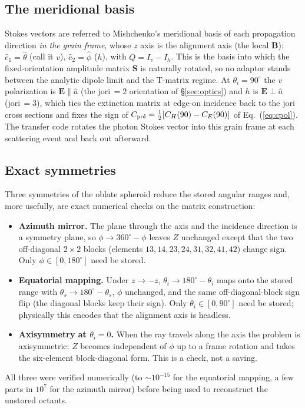 \documentclass{my_memo}
\let\mathbf\boldsymbol
\newcommand{\Cpol}{\ensuremath{C_{\rm pol}}}
\begin{document}
\subsection{The meridional basis}

Stokes vectors are referred to Mishchenko's meridional basis of each propagation
direction \emph{in the grain frame}, whose $z$ axis is the alignment axis (the
local $\mathbf{B}$): $\hat e_1 = \hat\theta$ (call it $v$), $\hat e_2 = \hat\phi$
($h$), with $Q = I_v - I_h$. This is the basis into which the fixed-orientation
amplitude matrix $\mathbf{S}$ is naturally rotated, so no adaptor stands between
the analytic dipole limit and the T-matrix regime. At $\theta_i = 90^\circ$ the
$v$ polarization is $\mathbf{E}\parallel\hat a$ (the jori\,$=2$ orientation of
\S\ref{sec:optics}) and $h$ is $\mathbf{E}\perp\hat a$ (jori\,$=3$), which ties
the extinction matrix at edge-on incidence back to the jori cross sections and
fixes the sign of $\Cpol = \tfrac12[C_H(90) - C_E(90)]$ of Eq.~(\ref{eq:cpol}).
The transfer code rotates the photon Stokes vector into this grain frame at each
scattering event and back out afterward.

\subsection{Exact symmetries}

Three symmetries of the oblate spheroid reduce the stored angular ranges and, more
usefully, are exact numerical checks on the matrix construction:
\begin{itemize}
\item \textbf{Azimuth mirror.} The plane through the axis and the incidence
      direction is a symmetry plane, so $\phi\to360^\circ-\phi$ leaves $Z$
      unchanged except that the two off-diagonal $2\times2$ blocks (elements
      $13,14,23,24,31,32,41,42$) change sign. Only $\phi\in[0,180^\circ]$ need be
      stored.
\item \textbf{Equatorial mapping.} Under $z\to-z$, $\theta_i\to180^\circ-\theta_i$
      maps onto the stored range with $\theta_s\to180^\circ-\theta_s$, $\phi$
      unchanged, and the same off-diagonal-block sign flip (the diagonal blocks
      keep their sign). Only $\theta_i\in[0,90^\circ]$ need be stored; physically
      this encodes that the alignment axis is headless.
\item \textbf{Axisymmetry at $\theta_i=0$.} When the ray travels along the axis
      the problem is axisymmetric: $Z$ becomes independent of $\phi$ up to a frame
      rotation and takes the six-element block-diagonal form. This is a check, not
      a saving.
\end{itemize}
All three were verified numerically (to $\sim10^{-15}$ for the equatorial mapping,
a few parts in $10^{7}$ for the azimuth mirror) before being used to reconstruct
the unstored octants.
\end{document}
